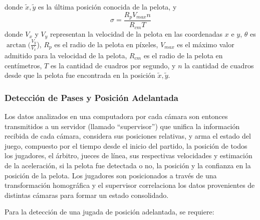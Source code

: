 \documentclass[a4paper,10pt]{article}
\begin{document}
donde $\tilde{x},\tilde{y}$ es la última posición conocida de la pelota, y
\[
  \sigma = \frac{R_p V_{max} n}{R_{cm}T}
\]
donde $V_x$ y $V_y$ representan la velocidad de la pelota en las coordenadas
$x$ e $y$, $\theta$ es $\arctan(\tfrac{V_y}{V_x}$), $R_p$ es el radio de la pelota
en píxeles, $V_{max}$ es el máximo valor admitido para la velocidad de la
pelota, $R_{cm}$ es el radio de la pelota en centímetros, $T$ es la cantidad de
cuadros por segundo, y $n$ la cantidad de cuadros desde que la pelota fue
encontrada en la posición $\tilde{x},\tilde{y}$.


\subsubsection{Detección de Pases y Posición Adelantada}

Los datos analizados en una computadora por cada cámara son entonces transmitidos
a un servidor (llamado ``supervisor'') que unifica la información recibida de
cada cámara, considera sus posiciones relativas, y arma el estado del juego,
compuesto por el tiempo desde el inicio del partido, la posición de todos los
jugadores, el árbitro, jueces de línea, sus respectivas velocidades y estimación
de la aceleración, si la pelota fue detectada o no, la posición y la confianza
en la posición de la pelota. Los jugadores son posicionados a través de una
transformación homográfica y el supervisor correlaciona los datos provenientes
de distintas cámaras para formar un estado consolidado.

Para la detección de una jugada de posición adelantada, se requiere:
\end{document}

